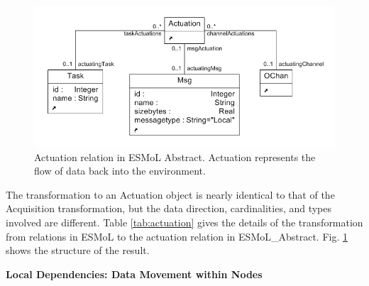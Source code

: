 \begin{figure}
\centering
\includegraphics[width=0.6\columnwidth]{figures/actuation.png}
    \caption{Actuation relation in ESMoL Abstract. Actuation represents the
flow of data back into the environment.}
    \label{fig:act_meta}
\end{figure}

The transformation to an Actuation object is nearly identical to that of the 
Acquisition transformation, but the data direction, cardinalities, and types 
involved are different.  Table \ref{tab:actuation} gives the details of the
transformation from relations in ESMoL to the actuation relation in 
ESMoL\_Abstract.  Fig. \ref{fig:act_meta} shows the structure of the result.

\textbf{Local Dependencies: Data Movement within Nodes}


